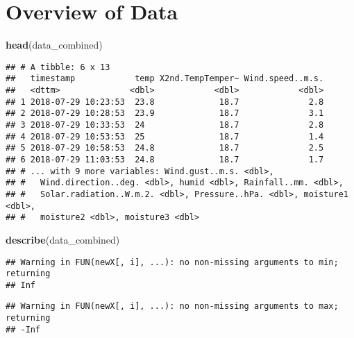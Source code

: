 \documentclass[]{article}
\newenvironment{Shaded}{\begin{snugshade}}{\end{snugshade}}
\newcommand{\KeywordTok}[1]{\textcolor[rgb]{0.13,0.29,0.53}{\textbf{#1}}}
\newcommand{\NormalTok}[1]{#1}
\begin{document}
\section{Overview of Data}\label{overview-of-data}

\begin{Shaded}
\begin{Highlighting}[]
\KeywordTok{head}\NormalTok{(data_combined)}
\end{Highlighting}
\end{Shaded}

\begin{verbatim}
## # A tibble: 6 x 13
##   timestamp            temp X2nd.TempTemper~ Wind.speed..m.s.
##   <dttm>              <dbl>            <dbl>            <dbl>
## 1 2018-07-29 10:23:53  23.8             18.7              2.8
## 2 2018-07-29 10:28:53  23.9             18.7              3.1
## 3 2018-07-29 10:33:53  24               18.7              2.8
## 4 2018-07-29 10:53:53  25               18.7              1.4
## 5 2018-07-29 10:58:53  24.8             18.7              2.5
## 6 2018-07-29 11:03:53  24.8             18.7              1.7
## # ... with 9 more variables: Wind.gust..m.s. <dbl>,
## #   Wind.direction..deg. <dbl>, humid <dbl>, Rainfall..mm. <dbl>,
## #   Solar.radiation..W.m.2. <dbl>, Pressure..hPa. <dbl>, moisture1 <dbl>,
## #   moisture2 <dbl>, moisture3 <dbl>
\end{verbatim}

\begin{Shaded}
\begin{Highlighting}[]
\KeywordTok{describe}\NormalTok{(data_combined)}
\end{Highlighting}
\end{Shaded}

\begin{verbatim}
## Warning in FUN(newX[, i], ...): no non-missing arguments to min; returning
## Inf
\end{verbatim}

\begin{verbatim}
## Warning in FUN(newX[, i], ...): no non-missing arguments to max; returning
## -Inf
\end{verbatim}
\end{document}
